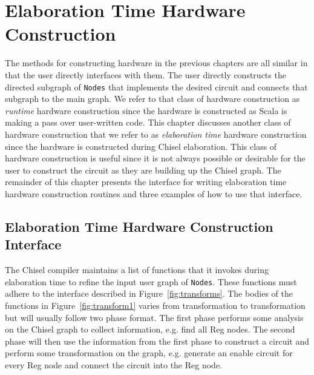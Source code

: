 \section{Elaboration Time Hardware Construction}
The methods for constructing hardware in the previous chapters are all
similar in that the user directly interfaces with them. The user
directly constructs the directed subgraph of {\tt Nodes} that
implements the desired circuit and connects that subgraph to the main
graph. We refer to that class of hardware construction as 
{\it runtime} hardware construction since the hardware is
constructed as Scala is making a pass over user-written code. This
chapter discusses another class of hardware construction that we refer
to as {\it elaboration time} hardware construction since the
hardware is constructed during Chisel elaboration. This class of
hardware construction is useful since it is not always possible or
desirable for the user to construct the circuit as they are building
up the Chisel graph. The remainder of this chapter presents the
interface for writing elaboration time hardware construction routines
and three examples of how to use that interface.

\subsection{Elaboration Time Hardware Construction Interface}
The Chisel compiler maintains a list of functions that it invokes
during elaboration time to refine the input user graph of 
{\tt Nodes}. These functions must adhere to the interface described in
Figure~\ref{fig:transforms}. The bodies of the functions in
Figure~\ref{fig:transform1} varies from transformation to
transformation but will usually follow two phase format. The first
phase performs some analysis on the Chisel graph to collect
information, e.g. find all Reg nodes. The second phase will then use
the information from the first phase to construct a circuit and
perform some transformation on the graph, e.g. generate an enable
circuit for every Reg node and connect the circuit into the Reg node.


